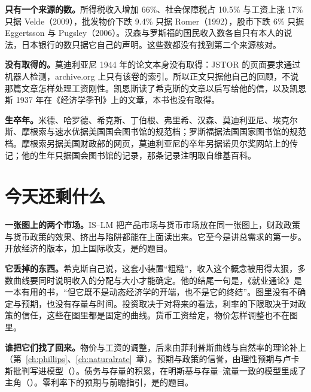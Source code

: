 \begin{deeper}[史料说明]
\textbf{只有一个来源的数。}所得税收入增加 66\%、社会保障税占 10.5\% 与工资上涨 17\% 只据 Velde（2009），批发物价下跌 9.4\% 只据 Romer（1992），股市下跌 6\% 只据 Eggertsson 与 Pugsley（2006）。汉森与罗斯福的国民收入数各自只有本人的说法，日本银行的数只据它自己的声明。这些数都没有找到第二个来源核对。

\textbf{没有取得的。}莫迪利亚尼 1944 年的论文本身没有取得：JSTOR 的页面要求通过机器人检测，archive.org 上只有该卷的索引。所以正文只据他自己的回顾，不说那篇文章怎样处理工资刚性。凯恩斯读了希克斯的文章以后写给他的信，以及凯恩斯 1937 年在《经济学季刊》上的文章，本书也没有取得。

\textbf{生卒年。}米德、哈罗德、希克斯、丁伯根、弗里希、汉森、莫迪利亚尼、埃克尔斯、摩根索与速水优据美国国会图书馆的规范档；罗斯福据法国国家图书馆的规范档。摩根索另据美国财政部的网页，莫迪利亚尼的卒年另据诺贝尔奖网站上的传记；他的生年只据国会图书馆的记录，那条记录注明取自维基百科。
\end{deeper}

\section{今天还剩什么}\label{sec:islm-legacy}

\textbf{一张图上的两个市场。}IS–LM 把产品市场与货币市场放在同一张图上，财政政策与货币政策的效果、挤出与陷阱都能在上面读出来。它至今是讲总需求的第一步。开放经济的版本，加上国际收支，是的题目。

\textbf{它丢掉的东西。}希克斯自己说，这套小装置“粗糙”，收入这个概念被用得太狠，多数曲线要同时说明收入的分配与大小才能确定\cite{hicks1937}。他的结尾一句是，《就业通论》是一本有用的书，“但它既不是动态经济学的开端，也不是它的终结”\cite{hicks1937}。图里没有不确定与预期，也没有存量与时间。投资取决于对将来的看法，利率的下限取决于对政策的信任，这些在图里都是固定的曲线。货币工资给定，物价怎样调整也不在图里。

\textbf{谁把它们找了回来。}物价与工资的调整，后来由菲利普斯曲线与自然率的理论补上（第~\ref{ch:phillips}、\ref{ch:naturalrate}~章）。预期与政策的信誉，由理性预期与卢卡斯批判写进模型（）。债务与存量的积累，在明斯基与存量–流量一致的模型里成了主角（）。零利率下的预期与前瞻指引，是的题目。

